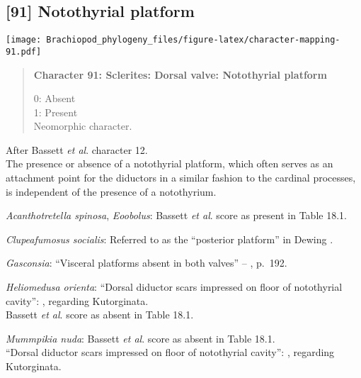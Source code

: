 \documentclass[openany]{book}
\theoremstyle{definition}
\theoremstyle{definition}
\theoremstyle{definition}
\theoremstyle{remark}
\begin{document}
\subsection*{{[}91{]} Notothyrial platform}\label{notothyrial-platform}

\texttt{[image: Brachiopod\_phylogeny\_files/figure-latex/character-mapping-91.pdf]}

\begin{quote}
\textbf{Character 91: Sclerites: Dorsal valve: Notothyrial platform}

0: Absent\\
1: Present\\
Neomorphic character.
\end{quote}

After Bassett \emph{et al}.
\citeyearpar{Bassett2001Functionalmorphology} character 12.\\
The presence or absence of a notothyrial platform, which often serves as
an attachment point for the diductors in a similar fashion to the
cardinal processes, is independent of the presence of a notothyrium.

\hypertarget{Acanthotretella_spinosa-coding-91}{}
\emph{Acanthotretella spinosa}, \emph{Eoobolus}: Bassett \emph{et al}.
\citeyearpar{Bassett2001Functionalmorphology} score as present in Table
18.1.

\hypertarget{Clupeafumosus_socialis-coding-91}{}
\emph{Clupeafumosus socialis}: Referred to as the ``posterior platform''
in Dewing \citeyearpar{Dewing2001Hingemodifications}.

\hypertarget{Gasconsia-coding-91}{}
\emph{Gasconsia}: ``Visceral platforms absent in both valves'' --
\citet{Williams2000LinguliformeaCraniiformea}, p.~192.

\hypertarget{Heliomedusa_orienta-coding-91}{}
\emph{Heliomedusa orienta}: ``Dorsal diductor scars impressed on floor
of notothyrial cavity'': \citet{Williams2000LinguliformeaCraniiformea},
regarding Kutorginata.\\
Bassett \emph{et al}. \citeyearpar{Bassett2001Functionalmorphology}
score as absent in Table 18.1.

\hypertarget{Mummpikia_nuda-coding-91}{}
\emph{Mummpikia nuda}: Bassett \emph{et al}.
\citeyearpar{Bassett2001Functionalmorphology} score as absent in Table
18.1.\\
``Dorsal diductor scars impressed on floor of notothyrial cavity'':
\citet{Williams2000LinguliformeaCraniiformea}, regarding Kutorginata.
\end{document}
